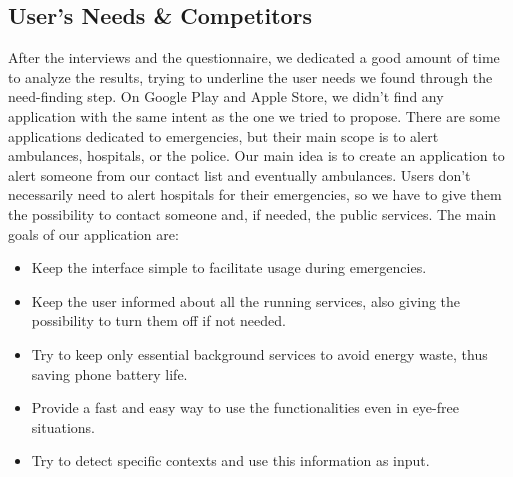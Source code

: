\documentclass[12pt]{article}
\begin{document}
\subsection{User's Needs \& Competitors}
After the interviews and the questionnaire, we dedicated a good amount of time to analyze the results, trying to underline the user needs we found through the need-finding step. On Google Play and Apple Store, we didn't find any application with the same intent as the one we tried to propose. There are some applications dedicated to emergencies, but their main scope is to alert ambulances, hospitals, or the police. Our main idea is to create an application to alert someone from our contact list and eventually ambulances. Users don't necessarily need to alert hospitals for their emergencies, so we have to give them the possibility to contact someone and, if needed, the public services. The main goals of our application are:
\begin{itemize}
    \item Keep the interface simple to facilitate usage during emergencies.
    \item Keep the user informed about all the running services, also giving the possibility to turn them off if not needed.
    \item Try to keep only essential background services to avoid energy waste, thus saving phone battery life.
    \item Provide a fast and easy way to use the functionalities even in eye-free situations.
    \item Try to detect specific contexts and use this information as input.
\end{itemize}
\end{document}
